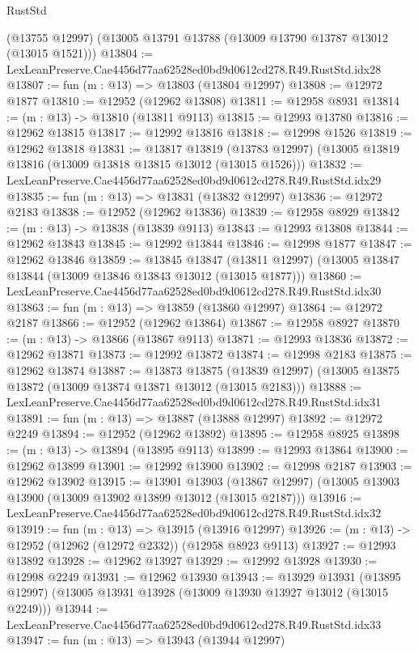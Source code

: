 \begin{lexlean}{RustStd}
\begin{coremodule}
    (@13755 @12997)
    (@13005 @13791 @13788 (@13009 @13790 @13787 @13012 (@13015 @1521)))
@13804 := LexLeanPreserve.Cae4456d77aa62528ed0bd9d0612cd278.R49.RustStd.idx28
@13807 := fun (m : @13) => @13803 (@13804 @12997)
@13808 := @12972 @1877
@13810 := @12952 (@12962 @13808)
@13811 := @12958 @8931
@13814 := (m : @13) -> @13810 (@13811 @9113)
@13815 := @12993 @13780
@13816 := @12962 @13815
@13817 := @12992 @13816
@13818 := @12998 @1526
@13819 := @12962 @13818
@13831 := @13817
    @13819
    (@13783 @12997)
    (@13005 @13819 @13816 (@13009 @13818 @13815 @13012 (@13015 @1526)))
@13832 := LexLeanPreserve.Cae4456d77aa62528ed0bd9d0612cd278.R49.RustStd.idx29
@13835 := fun (m : @13) => @13831 (@13832 @12997)
@13836 := @12972 @2183
@13838 := @12952 (@12962 @13836)
@13839 := @12958 @8929
@13842 := (m : @13) -> @13838 (@13839 @9113)
@13843 := @12993 @13808
@13844 := @12962 @13843
@13845 := @12992 @13844
@13846 := @12998 @1877
@13847 := @12962 @13846
@13859 := @13845
    @13847
    (@13811 @12997)
    (@13005 @13847 @13844 (@13009 @13846 @13843 @13012 (@13015 @1877)))
@13860 := LexLeanPreserve.Cae4456d77aa62528ed0bd9d0612cd278.R49.RustStd.idx30
@13863 := fun (m : @13) => @13859 (@13860 @12997)
@13864 := @12972 @2187
@13866 := @12952 (@12962 @13864)
@13867 := @12958 @8927
@13870 := (m : @13) -> @13866 (@13867 @9113)
@13871 := @12993 @13836
@13872 := @12962 @13871
@13873 := @12992 @13872
@13874 := @12998 @2183
@13875 := @12962 @13874
@13887 := @13873
    @13875
    (@13839 @12997)
    (@13005 @13875 @13872 (@13009 @13874 @13871 @13012 (@13015 @2183)))
@13888 := LexLeanPreserve.Cae4456d77aa62528ed0bd9d0612cd278.R49.RustStd.idx31
@13891 := fun (m : @13) => @13887 (@13888 @12997)
@13892 := @12972 @2249
@13894 := @12952 (@12962 @13892)
@13895 := @12958 @8925
@13898 := (m : @13) -> @13894 (@13895 @9113)
@13899 := @12993 @13864
@13900 := @12962 @13899
@13901 := @12992 @13900
@13902 := @12998 @2187
@13903 := @12962 @13902
@13915 := @13901
    @13903
    (@13867 @12997)
    (@13005 @13903 @13900 (@13009 @13902 @13899 @13012 (@13015 @2187)))
@13916 := LexLeanPreserve.Cae4456d77aa62528ed0bd9d0612cd278.R49.RustStd.idx32
@13919 := fun (m : @13) => @13915 (@13916 @12997)
@13926 := (m : @13) -> @12952 (@12962 (@12972 @2332)) (@12958 @8923 @9113)
@13927 := @12993 @13892
@13928 := @12962 @13927
@13929 := @12992 @13928
@13930 := @12998 @2249
@13931 := @12962 @13930
@13943 := @13929
    @13931
    (@13895 @12997)
    (@13005 @13931 @13928 (@13009 @13930 @13927 @13012 (@13015 @2249)))
@13944 := LexLeanPreserve.Cae4456d77aa62528ed0bd9d0612cd278.R49.RustStd.idx33
@13947 := fun (m : @13) => @13943 (@13944 @12997)

\end{coremodule}
\end{lexlean}
